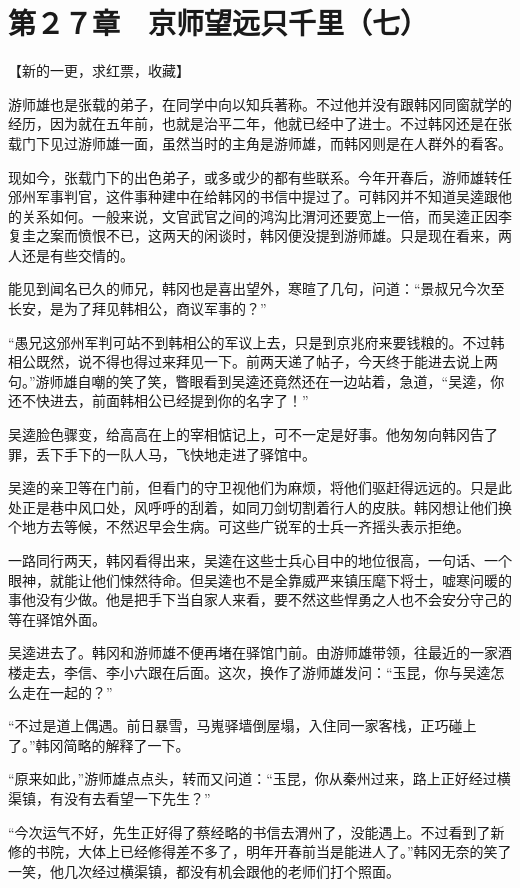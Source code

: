 \section{第２７章　京师望远只千里（七）}

【新的一更，求红票，收藏】

游师雄也是张载的弟子，在同学中向以知兵著称。不过他并没有跟韩冈同窗就学的经历，因为就在五年前，也就是治平二年，他就已经中了进士。不过韩冈还是在张载门下见过游师雄一面，虽然当时的主角是游师雄，而韩冈则是在人群外的看客。

现如今，张载门下的出色弟子，或多或少的都有些联系。今年开春后，游师雄转任邠州军事判官，这件事种建中在给韩冈的书信中提过了。可韩冈并不知道吴逵跟他的关系如何。一般来说，文官武官之间的鸿沟比渭河还要宽上一倍，而吴逵正因李复圭之案而愤恨不已，这两天的闲谈时，韩冈便没提到游师雄。只是现在看来，两人还是有些交情的。

能见到闻名已久的师兄，韩冈也是喜出望外，寒暄了几句，问道：“景叔兄今次至长安，是为了拜见韩相公，商议军事的？”

“愚兄这邠州军判可站不到韩相公的军议上去，只是到京兆府来要钱粮的。不过韩相公既然，说不得也得过来拜见一下。前两天递了帖子，今天终于能进去说上两句。”游师雄自嘲的笑了笑，瞥眼看到吴逵还竟然还在一边站着，急道，“吴逵，你还不快进去，前面韩相公已经提到你的名字了！”

吴逵脸色骤变，给高高在上的宰相惦记上，可不一定是好事。他匆匆向韩冈告了罪，丢下手下的一队人马，飞快地走进了驿馆中。

吴逵的亲卫等在门前，但看门的守卫视他们为麻烦，将他们驱赶得远远的。只是此处正是巷中风口处，风呼呼的刮着，如同刀剑切割着行人的皮肤。韩冈想让他们换个地方去等候，不然迟早会生病。可这些广锐军的士兵一齐摇头表示拒绝。

一路同行两天，韩冈看得出来，吴逵在这些士兵心目中的地位很高，一句话、一个眼神，就能让他们悚然待命。但吴逵也不是全靠威严来镇压麾下将士，嘘寒问暖的事他没有少做。他是把手下当自家人来看，要不然这些悍勇之人也不会安分守己的等在驿馆外面。

吴逵进去了。韩冈和游师雄不便再堵在驿馆门前。由游师雄带领，往最近的一家酒楼走去，李信、李小六跟在后面。这次，换作了游师雄发问：“玉昆，你与吴逵怎么走在一起的？”

“不过是道上偶遇。前日暴雪，马嵬驿墙倒屋塌，入住同一家客栈，正巧碰上了。”韩冈简略的解释了一下。

“原来如此，”游师雄点点头，转而又问道：“玉昆，你从秦州过来，路上正好经过横渠镇，有没有去看望一下先生？”

“今次运气不好，先生正好得了蔡经略的书信去渭州了，没能遇上。不过看到了新修的书院，大体上已经修得差不多了，明年开春前当是能进人了。”韩冈无奈的笑了一笑，他几次经过横渠镇，都没有机会跟他的老师们打个照面。

